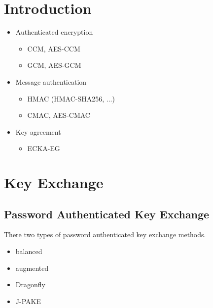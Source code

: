 
\chapter{Introduction}
\label{chap:introduction}

\begin{itemize}

    \item Authenticated encryption

        \begin{itemize}
            \item CCM, AES-CCM
            \item GCM, AES-GCM
        \end{itemize}

    \item Message authentication

        \begin{itemize}
            \item HMAC (HMAC-SHA256, $\ldots$)
            \item CMAC, AES-CMAC
        \end{itemize}

    \item Key agreement

        \begin{itemize}
            \item ECKA-EG
        \end{itemize}

\end{itemize}



\chapter{Key Exchange}
\label{chap:key_exchange}



\section{Password Authenticated Key Exchange}
\label{sec:pake}


There two types of password authenticated key exchange methods.

\begin{itemize}
    \item balanced
    \item augmented
\end{itemize}



\begin{itemize}
    \item Dragonfly
    \item J-PAKE
\end{itemize}




